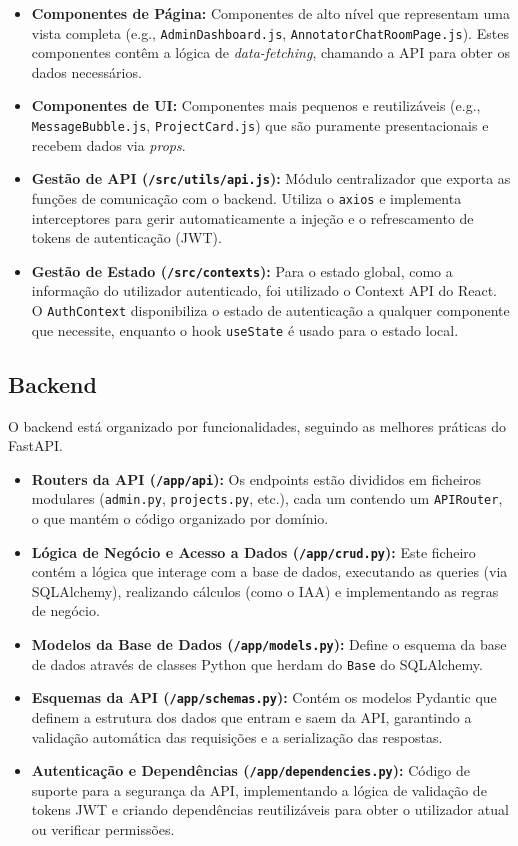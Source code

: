 \begin{itemize}
    \item \textbf{Componentes de Página:} Componentes de alto nível que representam uma vista completa (e.g., \texttt{AdminDashboard.js}, \texttt{AnnotatorChatRoomPage.js}). Estes componentes contêm a lógica de \textit{data-fetching}, chamando a API para obter os dados necessários.
    \item \textbf{Componentes de UI:} Componentes mais pequenos e reutilizáveis (e.g., \texttt{MessageBubble.js}, \texttt{ProjectCard.js}) que são puramente presentacionais e recebem dados via \textit{props}.
    \item \textbf{Gestão de API (\texttt{/src/utils/api.js}):} Módulo centralizador que exporta as funções de comunicação com o backend. Utiliza o \texttt{axios} e implementa interceptores para gerir automaticamente a injeção e o refrescamento de tokens de autenticação (JWT).
    \item \textbf{Gestão de Estado (\texttt{/src/contexts}):} Para o estado global, como a informação do utilizador autenticado, foi utilizado o Context API do React. O \texttt{AuthContext} disponibiliza o estado de autenticação a qualquer componente que necessite, enquanto o hook \texttt{useState} é usado para o estado local.
\end{itemize}

\subsection{Backend}

O backend está organizado por funcionalidades, seguindo as melhores práticas do FastAPI.

\begin{itemize}
    \item \textbf{Routers da API (\texttt{/app/api}):} Os endpoints estão divididos em ficheiros modulares (\texttt{admin.py}, \texttt{projects.py}, etc.), cada um contendo um \texttt{APIRouter}, o que mantém o código organizado por domínio.
    \item \textbf{Lógica de Negócio e Acesso a Dados (\texttt{/app/crud.py}):} Este ficheiro contém a lógica que interage com a base de dados, executando as queries (via SQLAlchemy), realizando cálculos (como o IAA) e implementando as regras de negócio.
    \item \textbf{Modelos da Base de Dados (\texttt{/app/models.py}):} Define o esquema da base de dados através de classes Python que herdam do \texttt{Base} do SQLAlchemy.
    \item \textbf{Esquemas da API (\texttt{/app/schemas.py}):} Contém os modelos Pydantic que definem a estrutura dos dados que entram e saem da API, garantindo a validação automática das requisições e a serialização das respostas.
    \item \textbf{Autenticação e Dependências (\texttt{/app/dependencies.py}):} Código de suporte para a segurança da API, implementando a lógica de validação de tokens JWT e criando dependências reutilizáveis para obter o utilizador atual ou verificar permissões.
\end{itemize}